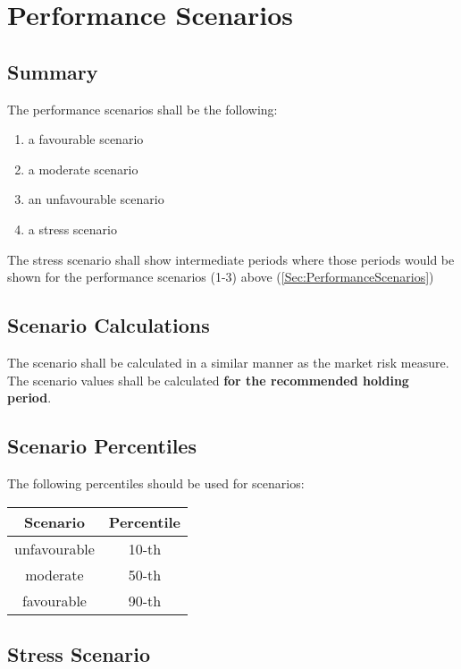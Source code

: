 \chapter{Performance Scenarios}

\section{Summary}
The performance scenarios shall be the following:
\begin{enumerate}
	\label{Sec:PerformanceScenarios}
	\item a favourable scenario
	\item a moderate scenario
	\item an unfavourable scenario
	\item a stress scenario
\end{enumerate}
The stress scenario shall show intermediate periods where those periods would be shown for the performance scenarios (1-3) above (\ref{Sec:PerformanceScenarios})

\section{Scenario Calculations}
The scenario shall be calculated in a similar manner as the market risk measure.\\
The scenario values shall be calculated \textbf{\color{blue}for the recommended holding period}.

\section{Scenario Percentiles}
The following percentiles should be used for scenarios:
\begin{center}
	\begin{longtable}{| c | c |}
		\hline
		\textbf{Scenario} & \textbf{Percentile}\\
		\hline
		unfavourable & 10-th\\
		\hline
		moderate & 50-th\\
		\hline
		favourable & 90-th\\
		\hline
	\end{longtable}
\end{center}

\section{Stress Scenario}

